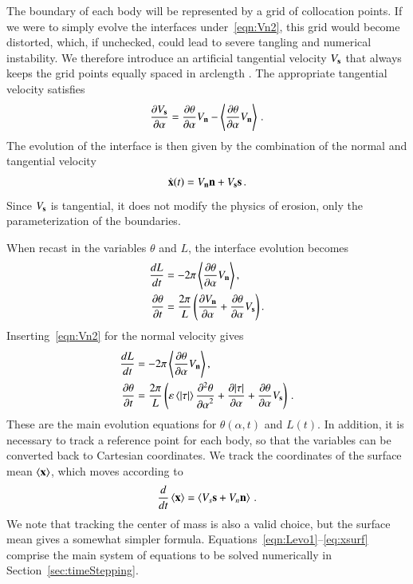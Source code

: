 \documentclass[preprint, 10pt]{elsarticle}
\begin{document}
The boundary of each body will be represented by a grid of collocation
points. If we were to simply evolve the interfaces
under~\eqref{eqn:Vn2}, this grid would become distorted, which, if
unchecked, could lead to severe tangling and numerical instability. We
therefore introduce an artificial tangential velocity $V_{\mathbf{s}}$ that always
keeps the grid points equally spaced in arclength \cite{hou-low-she1994}. The appropriate tangential velocity satisfies 
\begin{align}
\frac{\partial V_{\mathbf{s}}}{\partial \alpha} = \frac{\partial \theta}{\partial \alpha} V_{\mathbf{n}} - \left< \frac{\partial \theta}{\partial \alpha} V_{\mathbf{n}} \right> \, .
\end{align}
The evolution of the interface is then given by the combination of the normal and tangential velocity
\begin{align}
\dot{{\mathbf{x}}}(t) = V_{\mathbf{n}} {\mathbf{n}} + V_{\mathbf{s}} {\mathbf{s}} \, .
\end{align}
Since $V_{\mathbf{s}}$ is tangential, it does not modify the physics of erosion, only the parameterization of the boundaries.

When recast in the variables $\theta$ and $L$, the interface evolution becomes
\begin{align}
\frac{d L}{d t} &= - 2 \pi \left< \frac{\partial \theta}{\partial \alpha} V_{\mathbf{n}} \right>, \\
\frac{\partial \theta}{\partial t} &= \frac{2 \pi}{L} \left( \frac{\partial V_{\mathbf{n}}}{\partial \alpha} +
\frac{\partial \theta}{\partial \alpha} V_{\mathbf{s}} \right).
\end{align}
Inserting~\eqref{eqn:Vn2} for the normal velocity gives
\begin{align}
\label{eqn:Levo1}
\frac{d L}{d t} &= - 2 \pi \left< \frac{\partial \theta}{\partial \alpha} V_{\mathbf{n}} \right>, \\
\label{eqn:thetaevo1}
\frac{\partial \theta}{\partial t} &= \frac{2\pi}{L} \left(
\varepsilon \left< \lvert \tau \rvert \right> \frac{\partial^2 \theta}{{\partial \alpha}^2} + \frac{\partial \lvert \tau \rvert}{\partial \alpha} +
\frac{\partial \theta}{\partial \alpha} V_{\mathbf{s}} \right)\,.
\end{align}
These are the main evolution equations for $\theta(\alpha,t)$ and $L(t)$.
In addition, it is necessary to track a reference point for each body, so that the {\thL} variables can be converted back to Cartesian coordinates. We track the coordinates of the surface mean $\left< {\mathbf{x}} \right>$, which moves according to
\begin{align}
\label{eq:xsurf}
\frac{d}{dt} \left< {\mathbf{x}} \right> = \left<  V_s {\mathbf{s}} + V_n {\mathbf{n}}  \right> \, .
\end{align}
We note that tracking the center of mass is also a valid choice, but the surface mean gives a somewhat simpler formula. Equations~\eqref{eqn:Levo1}--\eqref{eq:xsurf} comprise the main system of equations to be solved numerically in Section~\ref{sec:timeStepping}. 
\end{document}
